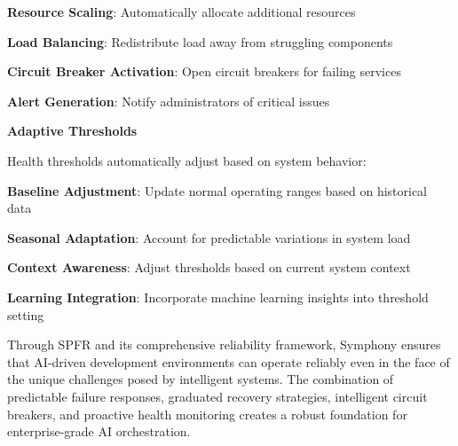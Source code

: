 \begin{compactlist}
    \item \textbf{Resource Scaling}: Automatically allocate additional resources
    \item \textbf{Load Balancing}: Redistribute load away from struggling components
    \item \textbf{Circuit Breaker Activation}: Open circuit breakers for failing services
    \item \textbf{Alert Generation}: Notify administrators of critical issues
\end{compactlist}

\textbf{Adaptive Thresholds}

Health thresholds automatically adjust based on system behavior:

\begin{compactlist}
    \item \textbf{Baseline Adjustment}: Update normal operating ranges based on historical data
    \item \textbf{Seasonal Adaptation}: Account for predictable variations in system load
    \item \textbf{Context Awareness}: Adjust thresholds based on current system context
    \item \textbf{Learning Integration}: Incorporate machine learning insights into threshold setting
\end{compactlist}

Through SPFR and its comprehensive reliability framework, Symphony ensures that AI-driven development environments can operate reliably even in the face of the unique challenges posed by intelligent systems. The combination of predictable failure responses, graduated recovery strategies, intelligent circuit breakers, and proactive health monitoring creates a robust foundation for enterprise-grade AI orchestration.